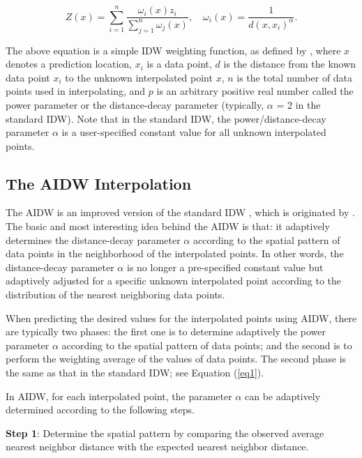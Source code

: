 \documentclass[final,5p,times,twocolumn,authoryear]{elsarticle}
\begin{document}
\begin{equation}
	\label{eq1}
	Z(x)=\sum\limits_{i=1}^n {\frac{\omega _i (x)z_i }{\sum\limits_{j=1}^n 
			{\omega _j (x)} }} ,
	\quad
	\omega _i (x)=\frac{1}{d(x,x_i )^\alpha }.
\end{equation}

The above equation is a simple IDW weighting function, as defined by \cite{01Shepard:1968:TIF:800186.810616}, where $x$ denotes a prediction location, $x_{i }$ is a data 
point, $d$ is the distance from the known data point $x_{i}$ to the unknown 
interpolated point $x$, $n$ is the total number of data points used in 
interpolating, and $p$ is an arbitrary positive real number called the power 
parameter or the distance-decay parameter (typically, $\alpha $ = 2 in the 
standard IDW). Note that in the standard IDW, the power/distance-decay 
parameter $\alpha $ is a user-specified constant value for all unknown 
interpolated points. 

\subsection{The AIDW Interpolation}
The AIDW is an improved version of the standard IDW \citep{01Shepard:1968:TIF:800186.810616}, which is 
originated by \cite{28DBLP:journals/gandc/LuW08}. The basic and most interesting 
idea behind the AIDW is that: it adaptively determines the distance-decay 
parameter $\alpha $ according to the spatial pattern of data points in the 
neighborhood of the interpolated points. In other words, the distance-decay 
parameter $\alpha $ is no longer a pre-specified constant value but 
adaptively adjusted for a specific unknown interpolated point according to 
the distribution of the nearest neighboring data points.

When predicting the desired values for the interpolated points using AIDW, 
there are typically two phases: the first one is to determine adaptively the 
power parameter $\alpha $ according to the spatial pattern of data points; 
and the second is to perform the weighting average of the values of data 
points. The second phase is the same as that in the standard IDW; see 
Equation (\ref{eq1}).

In AIDW, for each interpolated point, the
parameter $\alpha $ can be adaptively determined according to the following steps.

\textbf{Step 1}: Determine the spatial pattern by comparing the observed 
average nearest neighbor distance with the expected nearest neighbor 
distance.
\end{document}
